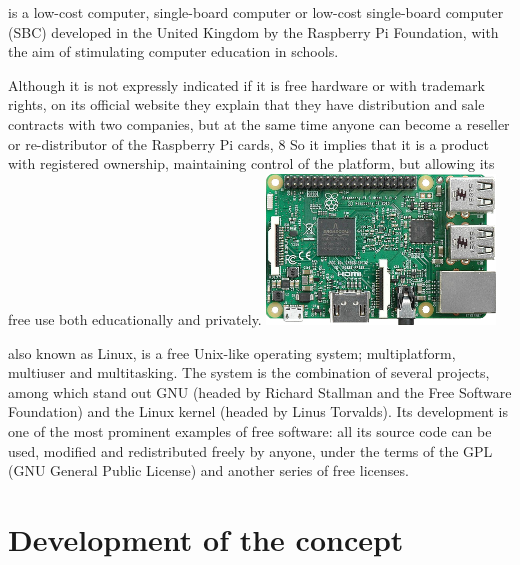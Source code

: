 \documentclass[11pt,a4paper,twocolumn]{article}
\begin{document}
\subtitle{
\textbf{Raspberry Pi
}} 

is a low-cost computer, single-board computer or low-cost single-board computer (SBC) developed in the United Kingdom by the Raspberry Pi Foundation, with the aim of stimulating computer education in schools.

Although it is not expressly indicated if it is free hardware or with trademark rights, on its official website they explain that they have distribution and sale contracts with two companies, but at the same time anyone can become a reseller or re-distributor of the Raspberry Pi cards, 8 So it implies that it is a product with registered ownership, maintaining control of the platform, but allowing its free use both educationally and privately.
\includegraphics[width=230]{Raspberry_Pi_3_Model_B}


\subtitle{
\textbf{GNU/Linux,}
} 
also known as Linux, is a free Unix-like operating system; multiplatform, multiuser and multitasking. The system is the combination of several projects, among which stand out GNU (headed by Richard Stallman and the Free Software Foundation) and the Linux kernel (headed by Linus Torvalds). Its development is one of the most prominent examples of free software: all its source code can be used, modified and redistributed freely by anyone, under the terms of the GPL (GNU General Public License) and another series of free licenses.

\section{Development of the concept}

\subtitle{
\textbf{GPS system}
}
\end{document}
